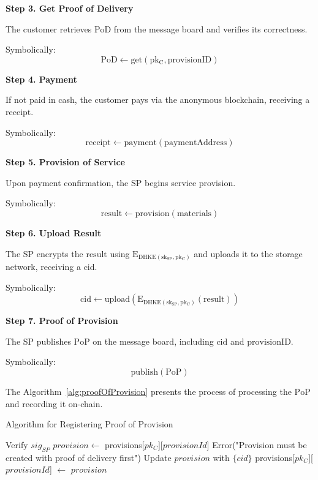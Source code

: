 \documentclass[pdftex,twocolumn,epjc3]{svjour3}
\begin{document}
\noindent \textbf{Step 3. Get Proof of Delivery}\label{step-3-get-pod}

The customer retrieves $\mathrm{PoD}$ from the message board and verifies its correctness.

Symbolically: 
\[
\mathrm{PoD \gets get(pk_C, provisionID)}
\]

\noindent \textbf{Step 4. Payment}\label{step-4-payment}

If not paid in cash, the customer pays via the anonymous blockchain, receiving a $\mathrm{receipt}$.

Symbolically: 
\[
\mathrm{receipt \gets payment(paymentAddress)}
\]

\noindent \textbf{Step 5. Provision of Service}\label{step-5-provision-of-service} 

Upon payment confirmation, the SP begins service provision.

Symbolically: 
\[
\mathrm{result \gets provision(materials)}
\]

\noindent \textbf{Step 6. Upload Result}\label{step-6-upload-result}

The SP encrypts the $\mathrm{result}$ using $\mathrm{E_{DHKE(sk_{SP}, pk_C)}}$ and uploads it to the storage network, receiving a $\mathrm{cid}$.

Symbolically: 
\[
\mathrm{cid \gets upload(E_{DHKE(sk_{SP}, pk_C)}(result))}
\]

\noindent \textbf{Step 7. Proof of Provision}\label{step-7-proof-of-provision}

The SP publishes $\mathrm{PoP}$ on the message board, including $\mathrm{cid}$ and $\mathrm{provisionID}$.

Symbolically: 
\[
\mathrm{publish(PoP)}
\]

The Algorithm~\ref{alg:proofOfProvision} presents the process of processing the $\mathrm{PoP}$ and recording it on-chain.

\begin{algorithm}
\caption{Algorithm for Registering Proof of Provision}
\label{alg:proofOfProvision}
\begin{algorithmic}[1]
    \State Verify $sig_{SP}$
    \State $provision \gets$ provisions[$pk_C$][$provisionId$]
        \State \Return Error("Provision must be created with proof of delivery first")
    \EndIf
    \State Update $provision$ with $\{cid\}$
    \State provisions[$pk_C$][$provisionId$] $\gets$ $provision$
\EndFunction
\end{algorithmic}
\end{algorithm}
\end{document}
